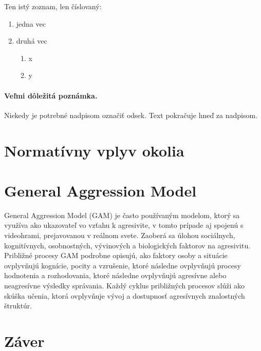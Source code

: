 \documentclass[10pt,twoside,slovak,a4paper]{article}
\begin{document}
Ten istý zoznam, len číslovaný:

\begin{enumerate}
\item jedna vec
\item druhá vec
	\begin{enumerate}
	\item x
	\item y
	\end{enumerate}
\end{enumerate}

\paragraph{Veľmi dôležitá poznámka.}
Niekedy je potrebné nadpisom označiť odsek. Text pokračuje hneď za nadpisom.


\section{Normatívny vplyv okolia} \label{normat}



\section{General Aggression Model} \label{GAM}
General Aggression Model (GAM) je často používaným modelom, ktorý sa využíva ako ukazovateľ vo vzťahu k agresivite, v tomto prípade aj spojenú s videohrami, prejavovanou v reálnom svete. Zaoberá sa úlohou sociálnych, kognitívnych, osobnostných, vývinových a biologických faktorov na agresivitu. Približné procesy GAM podrobne opisujú, ako faktory osoby a situácie ovplyvňujú kognície, pocity a vzrušenie, ktoré následne ovplyvňujú procesy hodnotenia a rozhodovania, ktoré následne ovplyvňujú agresívne alebo neagresívne výsledky správania. Každý cyklus približných procesov slúži ako skúška učenia, ktorá ovplyvňuje vývoj a dostupnosť agresívnych znalostných štruktúr\cite{GAM}. 


\section{Záver} \label{zaver} %






\end{document}
